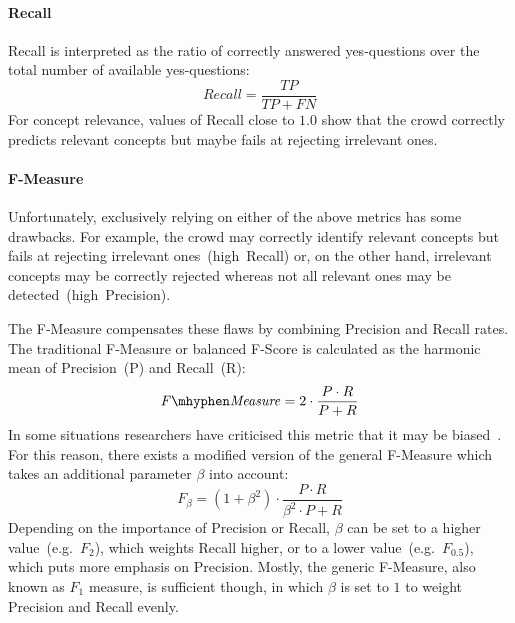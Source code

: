 \paragraph{Recall} Recall is interpreted as the ratio of correctly answered yes-questions over the total number of available yes-questions:
\[ Recall = \frac{TP}{TP + FN} \]
For concept relevance, values of Recall close to $1.0$ show that the crowd correctly predicts relevant concepts but maybe fails at rejecting irrelevant ones. 

\paragraph{F-Measure} Unfortunately, exclusively relying on either of the above metrics has some drawbacks. For example, the crowd may correctly identify relevant concepts but fails at rejecting irrelevant ones~(high~Recall) or, on the other hand, irrelevant concepts may be correctly rejected whereas not all relevant ones may be detected~(high~Precision). 

The F-Measure compensates these flaws by combining Precision and Recall rates. The traditional F-Measure or balanced F-Score is calculated as the harmonic mean of Precision~(P) and Recall~(R):
\[ \mathit{F \mhyphen Measure} = 2 \cdot \frac{P \cdot R}{P + R} \]
In some situations researchers have criticised this metric that it may be biased~\cite{powers2011}. For this reason, there exists a modified version of the general F-Measure which takes an additional parameter $\beta$ into account:
\[ F_\beta = (1 + \beta^2) \cdot \frac{P \cdot R}{\beta^2 \cdot P + R} \]
Depending on the importance of Precision or Recall, $\beta$ can be set to a higher value~(e.g.~$F_2$), which weights Recall higher, or to a lower value~(e.g.~$F_{0.5}$), which puts more emphasis on Precision. Mostly, the generic F-Measure, also known as $F_1$ measure, is sufficient though, in which $\beta$ is set to $1$ to weight Precision and Recall evenly. 


